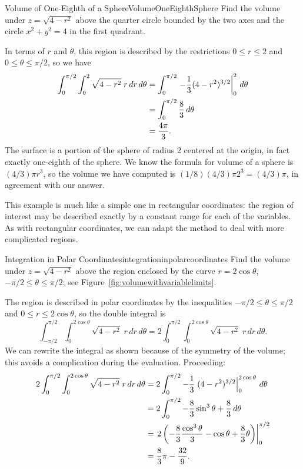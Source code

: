 \begin{example}{Volume of One-Eighth of a Sphere}{VolumeOneEighthSphere}
Find the volume under $z=\sqrt{4-r^2}$ 
above the quarter circle bounded by
the two axes and the circle $x^2+y^2=4$ in the first quadrant.
\end{example}
\begin{solution}
In terms of $r$ and $\theta$, this region is described by the
restrictions $0\le r\le 2$ and $0\le\theta\le\pi/2$, so we have
\begin{align*}
\int_{0}^{\pi/2}\int_{0}^{2} \sqrt{4-r^2}\;r\,dr\,d\theta
&=\int_{0}^{\pi/2}\left. -{1\over3}(4-r^2)^{3/2}\right|_0^2\,d\theta	\\
&=\int_{0}^{\pi/2} {8\over3}\,d\theta	\\
&={4\pi\over3}.
\end{align*}
The surface is a portion of the sphere of radius 2 centered at the
origin, in fact exactly one-eighth of the sphere. We know the formula
for volume of a sphere is $(4/3)\pi r^3$, so the volume we have
computed is $(1/8)(4/3)\pi 2^3=(4/3)\pi$, in agreement with our
answer.
\end{solution}

This example is much like a simple one in rectangular coordinates: the region
of interest may be described exactly by a constant range for
each of the variables. As with rectangular coordinates, we can adapt
the method to deal with more complicated regions.

\begin{example}{Integration in Polar Coordinates}{integrationinpolarcoordinates}
Find the volume under $z=\sqrt{4-r^2}$ above the region enclosed by the
curve $r=2\cos\theta$, $-\pi/2\le\theta\le\pi/2$; see
Figure~\ref{fig:volumewithvariablelimits}.
\end{example}
\begin{solution}
The region is described in polar coordinates by the inequalities
$-\pi/2\le\theta\le\pi/2$ and $0\le r\le2\cos\theta$, so
the double integral is
\[\int_{-\pi/2}^{\pi/2}\int_{0}^{2\cos\theta} \sqrt{4-r^2}\;r\,dr\,d\theta
=2\int_{0}^{\pi/2}\int_{0}^{2\cos\theta} \sqrt{4-r^2}\;r\,dr\,d\theta.\]
We can rewrite the integral as shown because of the symmetry of the
volume; this avoids a complication during the evaluation.
Proceeding:
\begin{align*}
2\int_{0}^{\pi/2}\int_{0}^{2\cos\theta} \sqrt{4-r^2}\;r\,dr\,d\theta
&=2\int_{0}^{\pi/2}-{1\over3}\left.(4-r^2)^{3/2}\right|_0^{2\cos\theta}\,d\theta	\\
&=2\int_{0}^{\pi/2}-{8\over3}\sin^3\theta+{8\over3}\,d\theta	\\
&=\left.2\left(-{8\over3}{\cos^3\theta\over3}-\cos\theta+{8\over3}\theta\right)\right|_0^{\pi/2}	\\
&={8\over3}\pi-{32\over9}.
\end{align*}
\end{solution}

